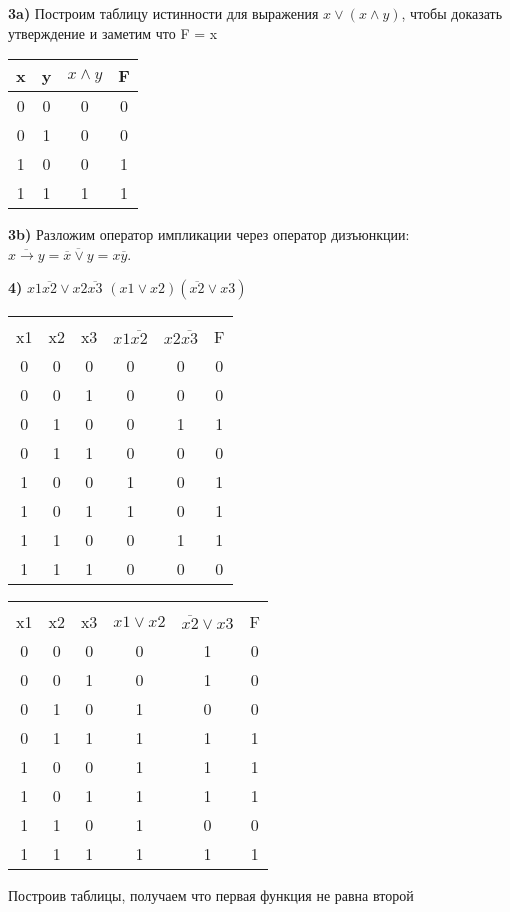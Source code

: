\documentclass[12pt,a4paper,fleqn]{article}
\begin{document}
{\bf 3a)} Построим таблицу истинности для выражения $x \lor (x \land y)$, чтобы доказать утверждение и заметим что F = x \newline


\begin{tabular}{| c | c | c | c |}
\hline
x & y & $x \land y$ & F \\ \hline
0 & 0 & 0 & 0 \\
0 & 1 & 0 & 0 \\
1 & 0 & 0 & 1 \\
1 & 1 & 1 & 1 \\ 
\hline
\end{tabular} \newline


{\bf 3b)} Разложим оператор импликации через оператор дизъюнкции:
\newline $\overline{x\rightarrow y} = \overline{\overline{x} \lor y} = x\overline{y}$. \newline


{\bf 4)} \quad \quad \quad $x1\overline{x2} \lor x2\overline{x3}$
\quad \quad \quad \quad \quad \quad \quad \quad \quad \quad 
$(x1 \lor x2)(\overline{x2} \lor x3)$ 


\begin{tabular}{| c | c | c | c | c | c|}
\hline
   &    &    &              &              &   \\
x1 & x2 & x3 & $x1\overline{x2}$ & $x2\overline{x3}$ & F \\ \hline
0 & 0 & 0 & 0 & 0 & 0 \\ 
0 & 0 & 1 & 0 & 0 & 0 \\
0 & 1 & 0 & 0 & 1 & 1 \\
0 & 1 & 1 & 0 & 0 & 0 \\
1 & 0 & 0 & 1 & 0 & 1 \\
1 & 0 & 1 & 1 & 0 & 1 \\
1 & 1 & 0 & 0 & 1 & 1 \\
1 & 1 & 1 & 0 & 0 & 0 \\
\hline
\end{tabular}
\quad
\begin{tabular}{| c | c | c | c | c | c|}
\hline
   &    &    &              &              &   \\
x1 & x2 & x3 & $x1 \lor x2$ & $\overline{x2} \lor x3$ & F \\ \hline
0 & 0 & 0 & 0 & 1 & 0 \\ 
0 & 0 & 1 & 0 & 1 & 0 \\
0 & 1 & 0 & 1 & 0 & 0 \\
0 & 1 & 1 & 1 & 1 & 1 \\
1 & 0 & 0 & 1 & 1 & 1 \\
1 & 0 & 1 & 1 & 1 & 1 \\
1 & 1 & 0 & 1 & 0 & 0 \\
1 & 1 & 1 & 1 & 1 & 1 \\
\hline
\end{tabular} 	\newline
				\newline
Построив таблицы, получаем что первая функция не равна второй \newpage
\end{document}
